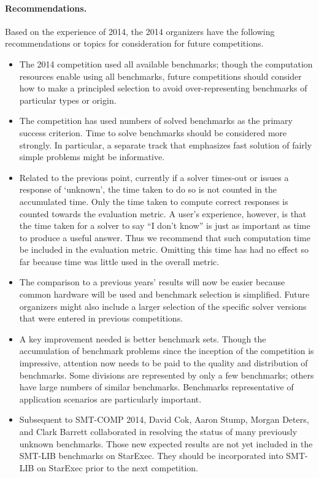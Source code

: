 \documentclass[twoside,11pt]{article}
\begin{document}
\paragraph{Recommendations.} Based on the experience of 2014, the 2014 organizers have the following recommendations or topics for consideration for future competitions.
\begin{itemize}
\item The 2014 competition used all available benchmarks; though the computation resources enable using all benchmarks, future competitions should consider how to make a principled selection to avoid over-representing benchmarks of particular types or origin.
\item The competition has used numbers of solved benchmarks as the primary success criterion. Time to solve benchmarks should be considered more strongly. In particular, a separate track that emphasizes fast solution of fairly simple problems might be informative.
\item Related to the previous point, currently if a solver times-out or issues a response of `unknown', the time taken to do so is not counted in the accumulated time. Only the time taken to compute correct responses is counted towards the evaluation metric.
A user's experience, however, is that the time taken for a solver to say ``I don't know'' is just as important as time to produce a useful answer. Thus we recommend that such
computation time be included in the evaluation metric. Omitting this time has had no effect so far because time was little used in the overall metric.
\item The comparison to a previous years' results will now be easier because common hardware will be used and benchmark selection is simplified. Future organizers might also include a larger selection of the specific solver versions that were entered in previous competitions. 
\item A key improvement needed is better benchmark sets. Though the accumulation of benchmark problems since the inception of the competition is impressive, attention now needs to be paid to the quality and distribution of benchmarks. Some divisions are represented by only a few benchmarks; others have large numbers of similar benchmarks.
Benchmarks representative of application scenarios are particularly important.
\item Subsequent to SMT-COMP 2014, David Cok, Aaron Stump, Morgan Deters, and Clark Barrett collaborated in resolving the status of many previously unknown benchmarks. Those new expected results are not yet included in the SMT-LIB benchmarks on StarExec. They should be incorporated into SMT-LIB on StarExec prior to the next competition.

\end{itemize}
\end{document}
